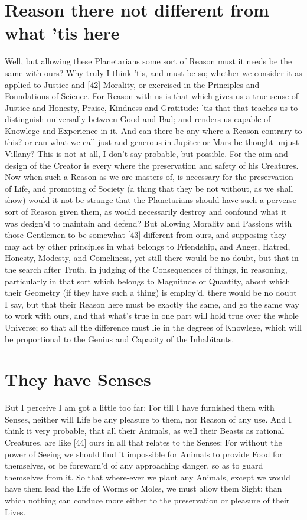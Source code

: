 \documentclass[letterpaper]{book}
\begin{document}
\section{Reason there not different from what 'tis here}

Well, but allowing these Planetarians some sort of Reason must it needs
be the same with ours? Why truly I think 'tis, and must be so; whether
we consider it as applied to Justice and [42] Morality, or exercised in the
Principles and Foundations of Science. For Reason with us is that which
gives us a true sense of Justice and Honesty, Praise, Kindness and Gratitude:
'tis that that teaches us to distinguish universally between Good and Bad;
and renders us capable of Knowlege and Experience in it. And can there be
any where a Reason contrary to this? or can what we call just and generous
in Jupiter or Mars be thought unjust Villany? This is not at all, I don't say
probable, but possible. For the aim and design of the Creator is every where
the preservation and safety of his Creatures. Now when such a Reason as
we are masters of, is necessary for the preservation of Life, and promoting
of Society (a thing that they be not without, as we shall show) would it not
be strange that the Planetarians should have such a perverse sort of Reason
given them, as would necessarily destroy and confound what it was design'd
to maintain and defend? But allowing Morality and Passions with those
Gentlemen to be somewhat [43] different from ours, and supposing they may
act by other principles in what belongs to Friendship, and Anger, Hatred,
Honesty, Modesty, and Comeliness, yet still there would be no doubt, but
that in the search after Truth, in judging of the Consequences of things, in
reasoning, particularly in that sort which belongs to Magnitude or Quantity,
about which their Geometry (if they have such a thing) is employ'd, there
would be no doubt I say, but that their Reason here must be exactly the
same, and go the same way to work with ours, and that what's true in one
part will hold true over the whole Universe; so that all the difference must
lie in the degrees of Knowlege, which will be proportional to the Genius and
Capacity of the Inhabitants.


\section{They have Senses}

But I perceive I am got a little too far: For till I have furnished them with
Senses, neither will Life be any pleasure to them, nor Reason of any use.
And I think it very probable, that all their Animals, as well their Beasts as
rational Creatures, are like [44] ours in all that relates to the Senses: For
without the power of Seeing we should find it impossible for Animals to
provide Food for themselves, or be forewarn'd of any approaching danger,
so as to guard themselves from it. So that where-ever we plant any Animals,
except we would have them lead the Life of Worms or Moles, we must allow
them Sight; than which nothing can conduce more either to the preservation
or pleasure of their Lives.
\end{document}
